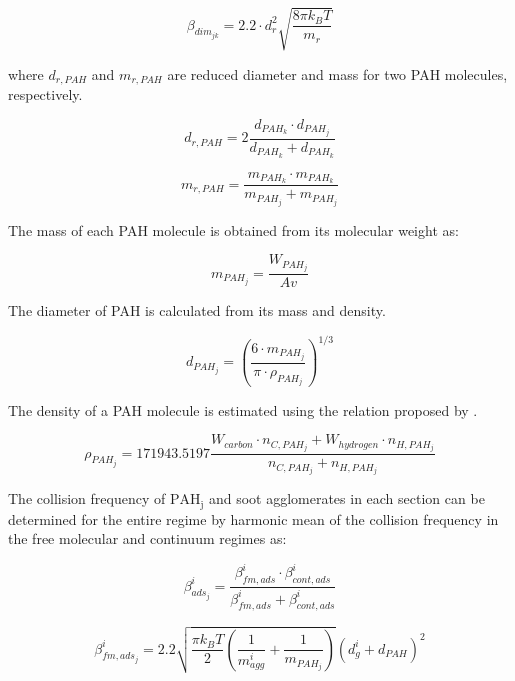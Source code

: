 \begin{equation}
	\beta_{dim_{jk}}=
	2.2 \cdot d^2_{r} \sqrt{\frac{8 \pi k_B T}{m_{r}}}
	\label{eqn:betadim}
\end{equation}

where ${d_{r,PAH}}$ and ${m_{r,PAH}}$ are reduced diameter and mass for two PAH molecules, respectively.

\begin{equation}
	d_{r,PAH}=
	2\frac{d_{PAH_k}\cdot d_{PAH_j}}{d_{PAH_k}+d_{PAH_k}}
	\label{eqn:drPAH}
\end{equation}

\begin{equation}
	m_{r,PAH}=
	\frac{m_{PAH_k}\cdot m_{PAH_k}}{m_{PAH_j}+ m_{PAH_j}}
	\label{eqn:mrPAH}
\end{equation}

The mass of each PAH molecule is obtained from its molecular weight as:

\begin{equation}
	m_{PAH_j}=
	\frac{W_{PAH_j}}{Av}
	\label{eqn:mPAH}
\end{equation}

The diameter of PAH is calculated from its mass and density.

\begin{equation}
	d_{PAH_j}=
	\left(
	\frac{6\cdot m_{PAH_j}}{\pi\cdot\rho_{PAH_j}}
	\right)^{1/3}
	\label{eqn:dPAH}
\end{equation}

The density of a PAH molecule is estimated using the relation proposed by \citet{johansson2016formation}.

\begin{equation}
	\rho_{PAH_j}= 
	171943.5197
	\frac{W_{carbon}\cdot n_{C,PAH_j}+W_{hydrogen}\cdot n_{H,PAH_j}}
	{n_{C,PAH_j}+n_{H,PAH_j}}
	\label{eqn:rhoPAH}
\end{equation}

The collision frequency of $\mathrm{PAH_j}$ and soot agglomerates in each section can be determined for the entire regime by harmonic mean of the collision frequency in the free molecular and continuum regimes as:

\begin{equation}
	\beta^i_{ads_j}=
	\frac{\beta^i_{fm, ads}\cdot \beta^i_{cont, ads}}
	{\beta^i_{fm, ads}+\beta^i_{cont, ads}}
	\label{eqn:betahmads}
\end{equation}

\begin{equation}
	\beta^i_{fm, ads_j}=
	2.2 
	\sqrt{
		\frac{\pi k_B T}{2}\left(\frac{1}{m^i_{agg}}+\frac{1}{m_{PAH_j}}\right)
	}
	\left(d^i_g+d_{PAH}\right)^2
	\label{eqn:betafmads}
\end{equation}


